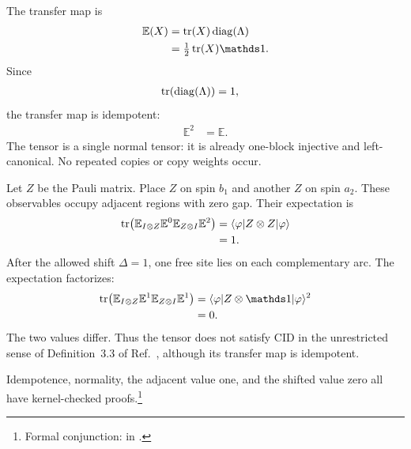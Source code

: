 \documentclass{article}
\begin{document}
The transfer map is
\begin{align}
    \mathbb E(X)
        &=\tr(X)\operatorname{diag}(\Lambda)
    \label{eq:cpsv16_pure_zcl_adjacent_gap_cid_scope_transfer_trace_form}\\
        &=\tfrac12\tr(X)\one.
    \label{eq:cpsv16_pure_zcl_adjacent_gap_cid_scope_transfer_depolarizing_form}
\end{align}
Since
\begin{align}
    \operatorname{tr}(\operatorname{diag}(\Lambda))
        &=1,
    \label{eq:cpsv16_pure_zcl_adjacent_gap_cid_scope_spectrum_normalization}
\end{align}
the transfer map is idempotent:
\begin{align}
    \mathbb E^2
        &=\mathbb E.
    \label{eq:cpsv16_pure_zcl_adjacent_gap_cid_scope_transfer_idempotence}
\end{align}
The tensor is a single normal tensor: it is already one-block injective and
left-canonical. No repeated copies or copy weights occur.

Let $Z$ be the Pauli matrix. Place $Z$ on spin $b_1$ and another $Z$ on spin
$a_2$. These observables occupy adjacent regions with zero gap. Their
expectation is
\begin{align}
    \operatorname{tr}\!\left(\mathbb E_{I\otimes Z}
      \mathbb E^0
      \mathbb E_{Z\otimes I}
      \mathbb E^2\right)
        &=\langle \varphi|Z\otimes Z|\varphi\rangle
    \label{eq:cpsv16_pure_zcl_adjacent_gap_cid_scope_adjacent_bell_expectation}\\
        &=1.
    \label{eq:cpsv16_pure_zcl_adjacent_gap_cid_scope_adjacent_value}
\end{align}
After the allowed shift $\Delta=1$, one free site lies on each complementary
arc. The expectation factorizes:
\begin{align}
    \tr\!\left(\mathbb E_{I\otimes Z}
      \mathbb E^1
      \mathbb E_{Z\otimes I}
      \mathbb E^1\right)
        &=\bra{\varphi}Z\otimes\one\ket{\varphi}^{2}
    \label{eq:cpsv16_pure_zcl_adjacent_gap_cid_scope_shifted_factorization}\\
        &=0.
    \label{eq:cpsv16_pure_zcl_adjacent_gap_cid_scope_shifted_value}
\end{align}
The two values differ. Thus the tensor does not satisfy CID in the unrestricted
sense of Definition~3.3 of Ref.~\cite{Cirac2016MPDO_arXiv}, although its
transfer map is idempotent.

Idempotence, normality, the adjacent value one, and the shifted value zero all
have kernel-checked proofs.\footnote{Formal conjunction:
in .}
\end{document}
